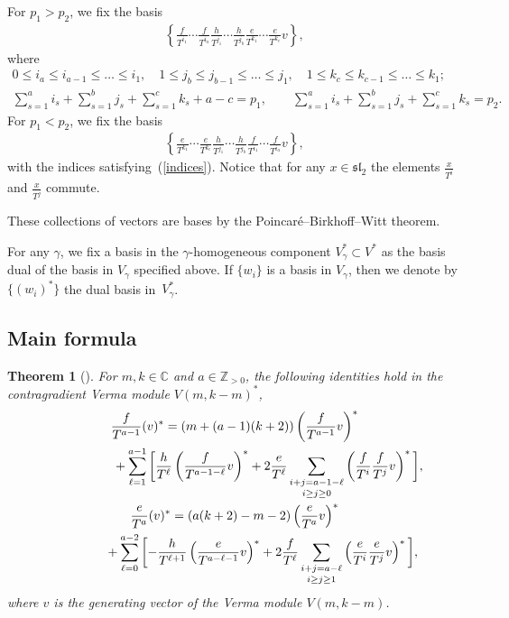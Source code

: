 \documentclass[pdftex]{sigma}
\numberwithin{equation}{section}
\newtheorem{thm}{Theorem}[section]
\begin{document}
For $p_1>p_2$, we fix the basis
\begin{gather*}%
\left\{\frac{f}{T^{i_1}}\cdots \frac{f}{T^{i_a}} \frac{h}{T^{j_1}}\cdots\frac{h}{T^{j_b}} \frac{e}{T^{k_1}}\cdots\frac{e}{T^{k_c}}v \right\},
\end{gather*}
where
\begin{gather}
0\leq i_a\leq i_{a-1}\leq\dots\leq i_1,\quad 1\leq j_b\leq j_{b-1}\leq\dots\leq j_1,\quad 1\leq k_c\leq k_{c-1}\leq\dots\leq k_1; \nonumber\\
\sum_{s=1}^a i_s + \sum_{s=1}^b j_s + \sum_{s=1}^c k_s + a - c = p_1, \qquad \sum_{s=1}^a i_s + \sum_{s=1}^b j_s + \sum_{s=1}^c k_s = p_2.\label{indices}
\end{gather}
For $p_1 < p_2$, we fix the basis
\begin{gather*}%
\left\{\frac{e}{T^{k_1}}\cdots\frac{e}{T^{k_c}} \frac{h}{T^{j_1}}\cdots\frac{h}{T^{j_b}} \frac{f}{T^{i_1}}\cdots\frac{f}{T^{i_a}}v\right\},
\end{gather*}
with the indices satisfying~(\ref{indices}). Notice that for any $x\in\mathfrak{sl}_2$ the elements $\frac x{T^i}$ and $\frac x{T^j}$ commute.

These collections of vectors are bases by the Poincar\'{e}--Birkhoff--Witt theorem.

 For any $\gamma$, we fix a basis in the $\gamma$-homogeneous component $V_\gamma^*\subset V^*$ as the basis dual of the basis in $V_\gamma$ specified above.
If $\{w_i\}$ is a basis in $V_\gamma$, then we denote by $\{(w_i)^*\}$ the dual basis in~$V^*_\gamma$.

\subsection{Main formula}
\begin{thm}[{\cite[Theorem 5.12]{SV2}}]\label{thm form}
For $m, k\in{\mathbb C}$ and $a\in{\mathbb Z}_{>0}$, the following identities hold in the contragradient Verma module $V(m,k-m)^*$,
\begin{gather}
\frac{f}{T^{a-1}} (v)^* = (m+(a-1)(k+2))\left(\frac{f}{T^{a-1}}v\right)^* \nonumber \\
\hphantom{\frac{f}{T^{a-1}} (v)^* =} + \sum_{\ell=1}^{a-1}\bigg[\frac{h}{T^\ell}\left(\frac{f}{T^{a-1-\ell}}v\right)^* + 2 \frac{e}{T^\ell}\mathop{\sum_{i+j=a-1-\ell}}_{i\geq j\geq 0} \left(\frac{f}{T^i}\frac{f}{T^j}v\right)^*\bigg], \label{id A}\\
\frac{e}{T^a} (v)^*=(a(k+2)-m-2) \left(\frac{e}{T^a}v\right)^* \nonumber\\
\hphantom{\frac{e}{T^a} (v)^*=} + \sum_{\ell=0}^{a-2}\bigg[{-} \frac{h}{T^{\ell+1}} \left(\frac{e}{T^{a-\ell-1}}v\right)^* + 2 \frac{f}{T^\ell}\mathop{\sum_{i+j=a-\ell}}_{i\geq j\geq 1} \left(\frac{e}{T^i}\frac{e}{T^j}v\right)^*\bigg],\label{id B}
\end{gather}
where $v$ is the generating vector of the Verma module $V(m,k-m)$.
\end{thm}
\end{document}
